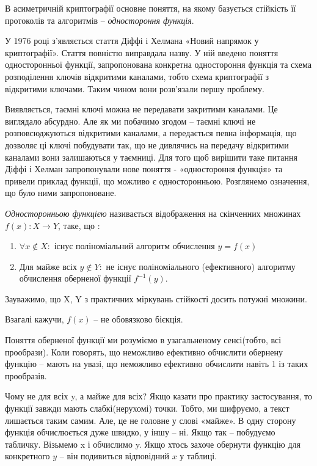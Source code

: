 В асиметричній криптографії основне поняття, на якому базується стійкість її протоколів та алгоритмів – \textit{одностороння функція}. 

У 1976 році з’являється стаття Діффі і Хелмана «Новий напрямок у криптографії». Стаття повністю виправдала назву. У ній введено поняття односторонньої функції, запропонована конкретна одностороння функція та схема розподілення ключів відкритими каналами, тобто схема криптографії з відкритими ключами. Таким чином вони розв’язали першу проблему.

Виявляється, таємні ключі можна не передавати закритими каналами. Це виглядало абсурдно. Але як ми побачимо згодом – таємні ключі не розповсюджуються відкритими каналами, а передається певна інформація, що дозволяє ці ключі побудувати так, що не дивлячись на передачу відкритими каналами вони залишаються у таємниці. Для того щоб вирішити таке питання Діффі і Хелман запропонували нове поняття - «одностороння функція» та привели приклад функції, що можливо є односторонньою. Розглянемо означення, що було ними запропоноване.

\begin{mydef}
\textit{Односторонньою функцією} називається відображення на скінченних множинах \( f(x) : X\rightarrow Y \), таке, що :
\begin{enumerate}
\item $\forall x \notin X \colon$ існує поліноміальний алгоритм обчислення $y = f(x)$

\item Для майже всіх $y\notin Y \colon$ не існує поліноміального (ефективного) алгоритму обчислення оберненої функції $f^{-1}(y)$.
\end{enumerate}
Зауважимо, що X, Y з практичних міркувань стійкості досить потужні множини.\par Взагалі кажучи, $f(x)$ – не обовязково бієкція.
\end{mydef}

Поняття оберненої функції ми розуміємо в узагальненому сенсі(тобто, всі прообрази). Коли говорять, що неможливо ефективно обчислити обернену функцію – мають на увазі, що неможливо ефективно обчислити навіть 1 із таких прообразів.

Чому не для всіх y, а майже для всіх? Якщо казати про практику застосування, то функції завжди мають слабкі(нерухомі) точки. Тобто, ми шифруємо, а текст лишається таким самим. Але, це не головне у слові «майже». В одну сторону функція обчислюється дуже швидко, у іншу – ні. Якщо так – побудуємо  табличку. Візьмемо x і обчислимо y. Якщо хтось захоче обернути функцію для конкретного $y$ – він подивиться відповідний $x$ у таблиці. 

